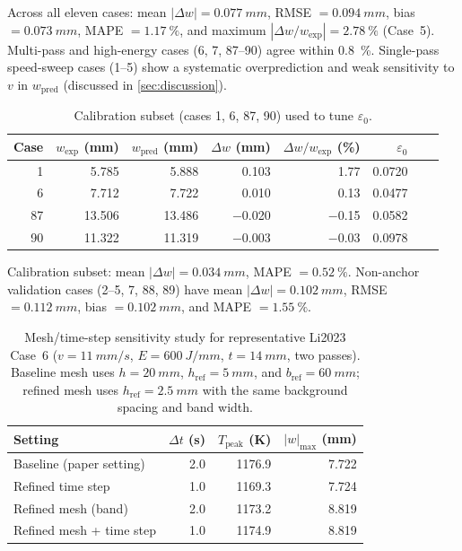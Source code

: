 \noindent Across all eleven cases: mean $|\Delta w|=\SI{0.077}{mm}$, RMSE $=\SI{0.094}{mm}$, bias $=\SI{0.073}{mm}$, MAPE $=\SI{1.17}{\%}$, and maximum $|\Delta w/w_{\mathrm{exp}}|=\SI{2.78}{\%}$ (Case~5). Multi-pass and high-energy cases (6, 7, 87--90) agree within \SI{0.8}{\%}. Single-pass speed-sweep cases (1--5) show a systematic overprediction and weak sensitivity to $v$ in $w_{\mathrm{pred}}$ (discussed in \cref{sec:discussion}).

\begin{table}[H]
\centering
\caption{Calibration subset (cases 1, 6, 87, 90) used to tune $\varepsilon_0$.}
\label{tab:li2023-cal}
\begin{tabular}{rrrrrrrr}
\toprule
Case & $w_{\mathrm{exp}}$ (mm) & $w_{\mathrm{pred}}$ (mm) & $\Delta w$ (mm) & $\Delta w/w_{\mathrm{exp}}$ (\%) & $\varepsilon_0$ \\
\midrule
1  & 5.785 & 5.888 &  0.103 &  1.77 & 0.0720 \\
6  & 7.712 & 7.722 &  0.010 &  0.13 & 0.0477 \\
87 & 13.506 & 13.486 & $-$0.020 & $-$0.15 & 0.0582 \\
90 & 11.322 & 11.319 & $-$0.003 & $-$0.03 & 0.0978 \\
\bottomrule
\end{tabular}
\end{table}

\noindent Calibration subset: mean $|\Delta w|=\SI{0.034}{mm}$, MAPE $=\SI{0.52}{\%}$. Non-anchor validation cases (2--5, 7, 88, 89) have mean $|\Delta w|=\SI{0.102}{mm}$, RMSE $=\SI{0.112}{mm}$, bias $=\SI{0.102}{mm}$, and MAPE $=\SI{1.55}{\%}$.

\begin{table}[H]
\centering
\caption{Mesh/time-step sensitivity study for representative Li2023 Case~6 ($v=\SI{11}{mm/s}$, $E=\SI{600}{J/mm}$, $t=\SI{14}{mm}$, two passes). Baseline mesh uses $h=\SI{20}{mm}$, $h_{\mathrm{ref}}=\SI{5}{mm}$, and $b_{\mathrm{ref}}=\SI{60}{mm}$; refined mesh uses $h_{\mathrm{ref}}=\SI{2.5}{mm}$ with the same background spacing and band width.}
\label{tab:li2023-mesh-dt-sensitivity}
\small
\begin{tabular}{lrrr}
\toprule
Setting & $\Delta t$ (s) & $T_{\mathrm{peak}}$ (K) & $|w|_{\max}$ (mm) \\
\midrule
Baseline (paper setting) & 2.0 & 1176.9 & 7.722 \\
Refined time step & 1.0 & 1169.3 & 7.724 \\
Refined mesh (band) & 2.0 & 1173.2 & 8.819 \\
Refined mesh + time step & 1.0 & 1174.9 & 8.819 \\
\bottomrule
\end{tabular}
\end{table}

